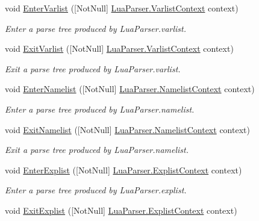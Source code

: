 \begin{DoxyCompactItemize}
void \mbox{\hyperlink{interfacezlua_1_1_i_lua_listener_a6803c862c7298f17d74bfcda8f6f159e}{Enter\+Varlist}} (\mbox{[}Not\+Null\mbox{]} \mbox{\hyperlink{classzlua_1_1_lua_parser_1_1_varlist_context}{Lua\+Parser.\+Varlist\+Context}} context)
\begin{DoxyCompactList}\small\item\em Enter a parse tree produced by Lua\+Parser.\+varlist. \end{DoxyCompactList}\item 
void \mbox{\hyperlink{interfacezlua_1_1_i_lua_listener_a25fcca7c6476226f6faf33597226f9b3}{Exit\+Varlist}} (\mbox{[}Not\+Null\mbox{]} \mbox{\hyperlink{classzlua_1_1_lua_parser_1_1_varlist_context}{Lua\+Parser.\+Varlist\+Context}} context)
\begin{DoxyCompactList}\small\item\em Exit a parse tree produced by Lua\+Parser.\+varlist. \end{DoxyCompactList}\item 
void \mbox{\hyperlink{interfacezlua_1_1_i_lua_listener_ad550fd673f32ad3d88572e1781551e41}{Enter\+Namelist}} (\mbox{[}Not\+Null\mbox{]} \mbox{\hyperlink{classzlua_1_1_lua_parser_1_1_namelist_context}{Lua\+Parser.\+Namelist\+Context}} context)
\begin{DoxyCompactList}\small\item\em Enter a parse tree produced by Lua\+Parser.\+namelist. \end{DoxyCompactList}\item 
void \mbox{\hyperlink{interfacezlua_1_1_i_lua_listener_acd614a0aa9df1e1ead1690e7598414df}{Exit\+Namelist}} (\mbox{[}Not\+Null\mbox{]} \mbox{\hyperlink{classzlua_1_1_lua_parser_1_1_namelist_context}{Lua\+Parser.\+Namelist\+Context}} context)
\begin{DoxyCompactList}\small\item\em Exit a parse tree produced by Lua\+Parser.\+namelist. \end{DoxyCompactList}\item 
void \mbox{\hyperlink{interfacezlua_1_1_i_lua_listener_a9e310e407a85f410ec1e17d632778708}{Enter\+Explist}} (\mbox{[}Not\+Null\mbox{]} \mbox{\hyperlink{classzlua_1_1_lua_parser_1_1_explist_context}{Lua\+Parser.\+Explist\+Context}} context)
\begin{DoxyCompactList}\small\item\em Enter a parse tree produced by Lua\+Parser.\+explist. \end{DoxyCompactList}\item 
void \mbox{\hyperlink{interfacezlua_1_1_i_lua_listener_ad4f41520ee19a409350ab83e01086217}{Exit\+Explist}} (\mbox{[}Not\+Null\mbox{]} \mbox{\hyperlink{classzlua_1_1_lua_parser_1_1_explist_context}{Lua\+Parser.\+Explist\+Context}} context)

\end{DoxyCompactItemize}
